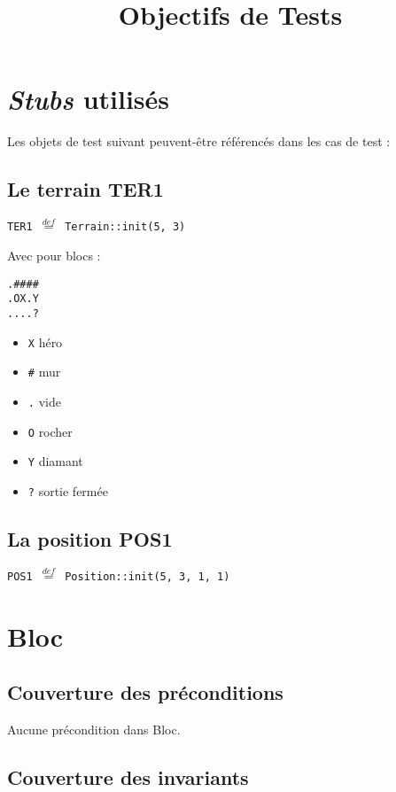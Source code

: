 \documentclass{article}
\title{Objectifs de Tests}
\author{}
\date{}
\newcommand{\cmd}[1]{\texttt{#1}}
\newcommand{\eqdef}{$\overset{def}{=}$}
\begin{document}
\maketitle{}

\section{\emph{Stubs} utilisés}

Les objets de test suivant peuvent-être référencés dans les cas de test :

\subsection{Le terrain TER1}

\cmd{TER1 \eqdef{} Terrain::init(5, 3)}

Avec pour blocs :

\begin{verbatim}
.####
.OX.Y
....?
\end{verbatim}

\begin{itemize}
	\item \cmd{X} héro
	\item \cmd{\#} mur
	\item \cmd{.} vide
	\item \cmd{O} rocher
	\item \cmd{Y} diamant
	\item \cmd{?} sortie fermée
\end{itemize}

\subsection{La position POS1}

\cmd{POS1 \eqdef{} Position::init(5, 3, 1, 1)}

\clearpage{}




\section{Bloc}

\subsection{Couverture des préconditions}

Aucune précondition dans Bloc.

\subsection{Couverture des invariants}
\end{document}
